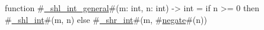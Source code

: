 function #\hyperref[sailRISCVzzyshlzyintzygeneral]{\_shl\_int\_general}#(m: int, n: int) -> int = if n >= 0 then #\hyperref[sailRISCVzzyshlzyint]{\_shl\_int}#(m, n) else #\hyperref[sailRISCVzzyshrzyint]{\_shr\_int}#(m, #\hyperref[sailRISCVznegate]{negate}#(n))
